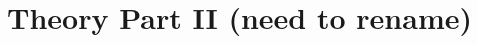 \documentclass[a4, 12pt]{book}
\begin{document}
\chapter{Theory Part II (need to rename)}





%

\end{document}
